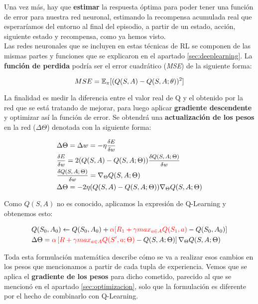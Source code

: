 \documentclass[11pt,fleqn]{book} %
\begin{document}
Una vez más, hay que \textbf{estimar} la respuesta óptima para poder tener una función de error para nuestra red neuronal, estimando la recompensa acumulada real que esperaríamos del entorno al final del episodio, a partir de un estado, acción, siguiente estado y recompensa, como ya hemos visto. \\

Las redes neuronales que se incluyen en estas técnicas de RL se componen de las mismas partes y funciones que se explicaron en el apartado \ref{sec:deeplearning}. La \textbf{función de perdida} podría ser el error cuadrático (\textit{MSE}) de la siguiente forma:

\begin{equation}
MSE= \mathbb{E}_\pi[(Q(S,A)-Q(S,A;\theta))^2]
\end{equation}

La finalidad es medir la diferencia entre el valor real de Q y el obtenido por la red que se está tratando de mejorar, para luego aplicar \textbf{gradiente descendente} y optimizar así la función de error. Se obtendrá una \textbf{actualización de los pesos} en la red ($\Delta\Theta$) denotada con la siguiente forma:

\begin{align}
\begin{split}
&\Delta\Theta = \Delta w = -\eta \mfrac{\delta E}{\delta w} \\
&\mfrac{\delta E}{\delta w} = 2(Q(S,A)-Q(S,A;\Theta))\mfrac{\delta Q(S,A;\Theta)}{\delta w}\\
&\mfrac{\delta Q(S,A;\Theta)}{\delta w}=\nabla_\Theta Q(S,A;\Theta) \\
&\Delta\Theta=-2\eta(Q(S,A)-Q(S,A;\Theta))\nabla_\Theta Q(S,A;\Theta)
\end{split} 
\end{align}

Como $Q(S,A)$ no es conocido, aplicamos la expresión de Q-Learning y obtenemos esto:

\begin{align}
\begin{split}
&Q(S_0,A_0) \leftarrow Q(S_0,A_0)+\color{red}\alpha[R_1+\gamma max_{a \in A}Q(S_1,a)\color{black}-Q(S_0,A_0)]\\
&\Delta\Theta=\color{red}\alpha\left[R+\gamma max_{a \in A} Q(S',a;\Theta)\color{black}-Q(S,A;\Theta)\right]\color{black}\nabla_\Theta Q(S,A;\Theta) 
\end{split}
\end{align}

Toda esta formulación matemática describe cómo se va a realizar esos cambios en los pesos que mencionamos a partir de cada tupla de experiencia. Vemos que se aplica el \textbf{gradiente de los pesos} para dicho cometido, parecido al que se mencionó en el apartado \ref{sec:optimizacion}, solo que la formulación es diferente por el hecho de combinarlo con Q-Learning.\\
\end{document}
